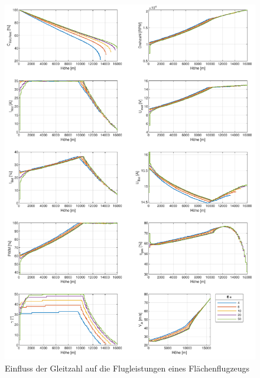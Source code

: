 \begin{figure}[H]
\centering
	\includegraphics[scale=0.7]{Diagramme/Flaechenflzg_E.pdf}
	\caption{Einfluss der Gleitzahl auf die Flugleistungen eines Flächenflugzeugs}
	\label{abb:gleitzahl}
\end{figure}


